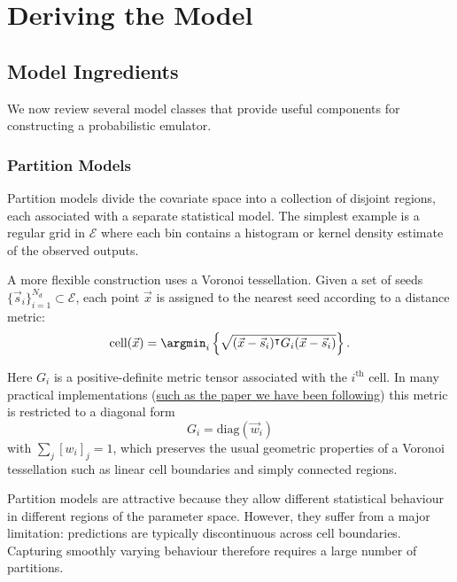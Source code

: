 \section{Deriving the Model}

	\subsection{Model Ingredients}

		We now review several model classes that provide useful components for constructing a probabilistic emulator.

		\subsubsection{Partition Models}

			Partition models divide the covariate space into a collection of disjoint regions, each associated with a separate statistical model.
			The simplest example is a regular grid in $\mathcal{E}$ where each bin contains a histogram or kernel density estimate of the observed outputs.

			A more flexible construction uses a Voronoi tessellation.
			Given a set of seeds $\{\vec{s}_i\}_{i=1}^{N_d} \subset \mathcal{E}$, each point $\vec{x}$ is assigned to the nearest seed according to a distance metric:
			\begin{equation}
				\text{cell}(\vec{x}) =
				\argmin_i
				\left\{
				\sqrt{(\vec{x}-\vec{s}_i)^\intercal G_i (\vec{x}-\vec{s}_i)}
				\right\}.
			\end{equation}

			Here $G_i$ is a positive-definite metric tensor associated with the $i^{\text{th}}$ cell.
			In many practical implementations (\href{https://www.jstor.org/stable/pdf/48583762.pdf}{such as the paper we have been following}) this metric is restricted to a diagonal form
			\begin{equation}
				G_i = \mathrm{diag}(\vec{w}_i)
			\end{equation}
			with $\sum_j [w_i]_j = 1$, which preserves the usual geometric properties of a Voronoi tessellation such as linear cell boundaries and simply connected regions.

			Partition models are attractive because they allow different statistical behaviour in different regions of the parameter space.
			However, they suffer from a major limitation: predictions are typically discontinuous across cell boundaries.
			Capturing smoothly varying behaviour therefore requires a large number of partitions.

